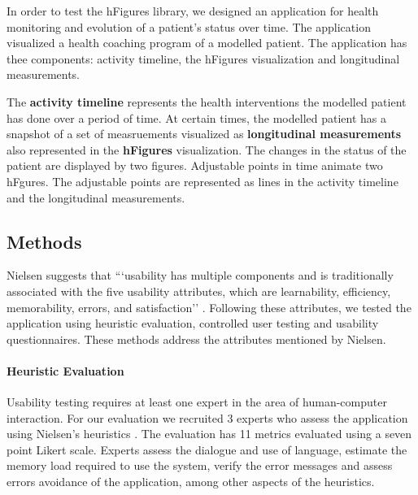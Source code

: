 \documentclass[twocolumn]{bmcart}%
\begin{document}
In order to test the hFigures library, we designed an application for health monitoring and evolution of a patient's status over time. The application visualized a health coaching program of a modelled patient. The application has thee components: activity timeline, the hFigures visualization and longitudinal measurements.

The \textbf{activity timeline} represents the health interventions the modelled patient has done over a period of time. At certain times, the modelled patient has a snapshot of a set of measruements visualized as \textbf{longitudinal measurements} also represented in the \textbf{hFigures} visualization. The changes in the status of the patient are displayed by two figures. Adjustable points in time animate two hFgures. The adjustable points are represented as lines in the activity timeline and the longitudinal measurements.

\subsection*{Methods}
Nielsen suggests that ```usability has multiple components and is traditionally associated with the five usability attributes, which are learnability, efficiency, memorability, errors, and satisfaction'' \cite{nielsen1994usability}. Following these attributes, we tested the application using heuristic evaluation, controlled user testing and usability questionnaires. These methods address the attributes mentioned by Nielsen.

\paragraph*{Heuristic Evaluation}
Usability testing requires at least one expert in the area of human-computer interaction. For our evaluation we recruited 3 experts who assess the application using Nielsen's heuristics \cite{nielsen1994usability}. The evaluation has 11 metrics evaluated using a seven point Likert scale. Experts assess the dialogue and use of language, estimate the memory load required to use the system, verify the error messages and assess errors avoidance of the application, among other aspects of the heuristics.
\end{document}

